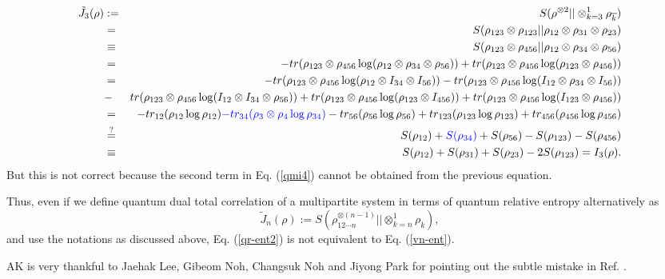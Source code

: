 \documentclass[aps,onecolumn,qic,superscriptaddress,11pt]{revtex4-1}
\begin{document}
\begin{eqnarray}
\tilde{J}_3(\rho) &:=& S(\rho^{\otimes 2} || \otimes^1_{k=3} \rho_{\overline{k}}) \nonumber \\
&=& S(\rho_{123} \otimes \rho_{123} || \rho_{12} \otimes \rho_{31} \otimes \rho_{23}) \nonumber \\
&\equiv & S(\rho_{123} \otimes \rho_{456} || \rho_{12} \otimes \rho_{34} \otimes \rho_{56}) \nonumber \\
&=& - tr (\rho_{123} \otimes \rho_{456} \log (\rho_{12} \otimes \rho_{34} \otimes \rho_{56})) + tr (\rho_{123} \otimes \rho_{456} \log (\rho_{123} \otimes \rho_{456})) \nonumber \\
&=& - tr (\rho_{123} \otimes \rho_{456} \log (\rho_{12} \otimes I_{34} \otimes I_{56})) - tr (\rho_{123} \otimes \rho_{456} \log (I_{12} \otimes \rho_{34} \otimes I_{56})) \nonumber \\
&-& tr (\rho_{123} \otimes \rho_{456} \log (I_{12} \otimes I_{34} \otimes \rho_{56})) + tr (\rho_{123} \otimes \rho_{456} \log (\rho_{123} \otimes I_{456})) + tr (\rho_{123} \otimes \rho_{456} \log (I_{123} \otimes \rho_{456}))\nonumber \\
&=& - tr_{12} (\rho_{12} \log \rho_{12}) {\color{blue} - tr_{34} (\rho_{3} \otimes \rho_{4} \log \rho_{34})} - tr_{56} (\rho_{56} \log \rho_{56}) + tr_{123} (\rho_{123} \log \rho_{123}) + tr_{456} (\rho_{456} \log \rho_{456}) \nonumber \\
&\overset{?}{=}& S(\rho_{12}) + {\color{blue}S(\rho_{34})} + S(\rho_{56}) - S(\rho_{123}) - S(\rho_{456}) \label{qmi4} \\
&\equiv & S(\rho_{12}) + S(\rho_{31}) + S(\rho_{23}) - 2 S(\rho_{123}) = I_3 (\rho).
\end{eqnarray}
But this is not correct because the second term in Eq. (\ref{qmi4}) cannot be obtained from the previous equation.

Thus, even if we define quantum dual total correlation of a multipartite system in terms of quantum relative entropy alternatively as
\begin{equation}\label{qr-ent2}
\tilde{J}_n(\rho) := S(\rho_{12\cdots n}^{\otimes (n-1)} || \otimes^1_{k=n} \rho_{\overline{k}}),
\end{equation}
and use the notations as discussed above, Eq. (\ref{qr-ent2}) is not equivalent to Eq. (\ref{vn-ent}).




\begin{acknowledgments}
AK is very thankful to Jaehak Lee, Gibeom Noh, Changsuk Noh and Jiyong Park for pointing out the subtle mistake in Ref. \cite{asu-qmi}. 
\end{acknowledgments}
\end{document}
